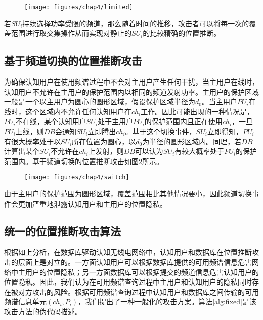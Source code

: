\begin{figure}[!htp]\label{fig:limited}
  \centering
  \texttt{[image: figures/chap4/limited]}
\end{figure}

若$SU_{i}$持续选择功率受限的频道，那么随着时间的推移，攻击者可以将每一次的覆盖范围进行取交集操作从而实现对静止的$SU_{i}$的比较精确的位置推断。

\subsection{基于频道切换的位置推断攻击}

为确保认知用户在使用频谱过程中不会对主用户产生任何干扰，当主用户在线时，认知用户不允许在主用户的保护范围内以相同的频道发射功率。主用户的保护区域一般是一个以主用户为圆心的圆形区域，假设保护区域半径为$d_{0}$。当主用户$PU_{i}$在线时，这个区域内不允许任何认知用户在$ch_{i}$工作。因此可能出现的一种情况是，$PU_{i}$不在线，某个认知用户$SU_{i}$处于主用户$PU_{i}$的保护范围内且正在使用$ch_{i}$，一旦$PU_{i}$上线，则$DB$会通知$SU_{i}$立即腾出$ch_{i}$。基于这个切换事件，$SU_{i}$立即得知，$PU_{i}$有很大概率处于以$SU_{i}$所在位置为圆心，以$d_{0}$为半径的圆形区域内。同理，若$DB$计算出某个$SU_{i}$不允许在$ch_{i}$上发射，则$DB$可以认为$SU_{i}$有较大概率处于$PU_{i}$的保护范围内。基于频道切换的位置推断攻击如图\ref{fig:switch}所示。

\begin{figure}[!htp]\label{fig:switch}
  \centering
  \texttt{[image: figures/chap4/switch]}
\end{figure}

由于主用户的保护范围为圆形区域，覆盖范围相比其他情况要小，因此频道切换事件会更加严重地泄露认知用户和主用户的位置隐私。

\subsection{统一的位置推断攻击算法}\label{alg-attack}

根据如上分析，在数据库驱动认知无线电网络中，认知用户和数据库在位置推断攻击的层面上是对立的。一方面认知用户可以根据数据库提供的可用频谱信息危害网络中主用户的位置隐私；另一方面数据库可以根据提交的频道信息危害认知用户的位置隐私。因此，我们认为在可用频谱查询过程中主用户和认知用户的隐私同时存在被对方攻击的风险。根据可用频谱查询过程中认知用户和数据库之间传输的可用频谱信息单元$(ch_{i},P_{i})$，我们提出了一种一般化的攻击方案。算法\ref{alg:fixed}是该攻击方法的伪代码描述。

